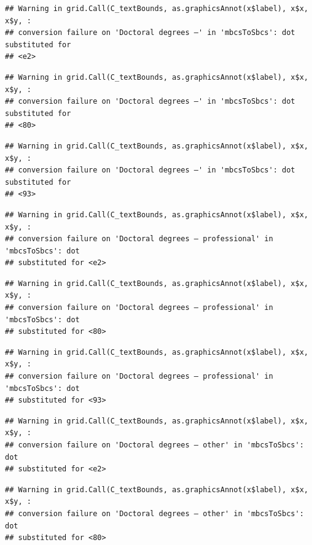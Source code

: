 \documentclass[
]{book}
\begin{document}
\begin{verbatim}
## Warning in grid.Call(C_textBounds, as.graphicsAnnot(x$label), x$x, x$y, :
## conversion failure on 'Doctoral degrees –' in 'mbcsToSbcs': dot substituted for
## <e2>
\end{verbatim}

\begin{verbatim}
## Warning in grid.Call(C_textBounds, as.graphicsAnnot(x$label), x$x, x$y, :
## conversion failure on 'Doctoral degrees –' in 'mbcsToSbcs': dot substituted for
## <80>
\end{verbatim}

\begin{verbatim}
## Warning in grid.Call(C_textBounds, as.graphicsAnnot(x$label), x$x, x$y, :
## conversion failure on 'Doctoral degrees –' in 'mbcsToSbcs': dot substituted for
## <93>
\end{verbatim}

\begin{verbatim}
## Warning in grid.Call(C_textBounds, as.graphicsAnnot(x$label), x$x, x$y, :
## conversion failure on 'Doctoral degrees – professional' in 'mbcsToSbcs': dot
## substituted for <e2>
\end{verbatim}

\begin{verbatim}
## Warning in grid.Call(C_textBounds, as.graphicsAnnot(x$label), x$x, x$y, :
## conversion failure on 'Doctoral degrees – professional' in 'mbcsToSbcs': dot
## substituted for <80>
\end{verbatim}

\begin{verbatim}
## Warning in grid.Call(C_textBounds, as.graphicsAnnot(x$label), x$x, x$y, :
## conversion failure on 'Doctoral degrees – professional' in 'mbcsToSbcs': dot
## substituted for <93>
\end{verbatim}

\begin{verbatim}
## Warning in grid.Call(C_textBounds, as.graphicsAnnot(x$label), x$x, x$y, :
## conversion failure on 'Doctoral degrees – other' in 'mbcsToSbcs': dot
## substituted for <e2>
\end{verbatim}

\begin{verbatim}
## Warning in grid.Call(C_textBounds, as.graphicsAnnot(x$label), x$x, x$y, :
## conversion failure on 'Doctoral degrees – other' in 'mbcsToSbcs': dot
## substituted for <80>
\end{verbatim}
\end{document}
